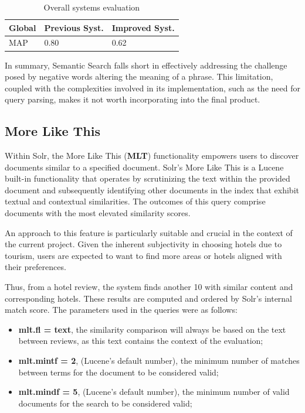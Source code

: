 \documentclass[sigconf]{acmart}
\begin{document}
\begin{table}[H]
\caption{Overall systems evaluation}
\label{tab:map_semantic}
\begin{tabular}{lll}
\toprule
Global & Previous Syst. & Improved Syst.\\
\midrule
MAP & 0.80 & 0.62  \\ 

\bottomrule
\end{tabular}
\end{table}


In summary, Semantic Search falls short in effectively addressing the challenge posed by negative words altering the meaning of a phrase. This limitation, coupled with the complexities involved in its implementation, such as the need for query parsing, makes it not worth incorporating into the final product.



\renewcommand{\thesubsection}{\arabic{section}.3}
\subsection{More Like This}

Within Solr, the More Like This (\textbf{MLT}) functionality empowers users to discover documents similar to a specified document. Solr's More Like This is a Lucene \cite{Lucene} built-in functionality that operates by scrutinizing the text within the provided document and subsequently identifying other documents in the index that exhibit textual and contextual similarities. The outcomes of this query comprise documents with the most elevated similarity scores.

An approach to this feature is particularly suitable and crucial in the context of the current project. Given the inherent subjectivity in choosing hotels due to tourism, users are expected to want to find more areas or hotels aligned with their preferences.

Thus, from a hotel review, the system finds another 10 with similar content and corresponding hotels. These results are computed and ordered by Solr's internal match score. The parameters used in the queries were as follows:

\begin{itemize}
    \item \textbf{mlt.fl = text}, the similarity comparison will always be based on the text between reviews, as this text contains the context of the evaluation;
    \item \textbf{mlt.mintf = 2}, (Lucene's default number), the minimum number of matches between terms for the document to be considered valid;
    \item \textbf{mlt.mindf = 5}, (Lucene's default number), the minimum number of valid documents for the search to be considered valid;
\end{itemize}
\end{document}
